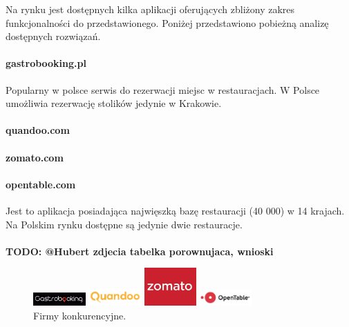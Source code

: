 \documentclass{article}
\begin{document}
Na rynku jest dostępnych kilka aplikacji oferujących zbliżony zakres funkcjonalności do przedstawionego. Poniżej przedstawiono pobieżną analizę dostępnych rozwiązań.

\paragraph{gastrobooking.pl}
Popularny w polsce serwis do rezerwacji miejsc w restauracjach. W Polsce umożliwia rezerwację stolików jedynie w Krakowie. 

\paragraph{quandoo.com}


\paragraph{zomato.com}

\paragraph{opentable.com}
Jest to aplikacja posiadająca najwięszką bazę restauracji (40 000) w 14 krajach. Na Polskim rynku dostępne są jedynie dwie restauracje. \\\\
{\color{red}\textbf{TODO: @Hubert zdjecia tabelka porownujaca, wnioski}}


\begin{figure}[h]
\centering
		\begin{minipage}{2cm}
			\includegraphics[width=2cm]{firma1}
		\end{minipage}
		\begin{minipage}{2cm}
			\includegraphics[width=2cm]{firma2}
		\end{minipage}
		\begin{minipage}{2cm}
			\includegraphics[width=2cm]{firma3}
		\end{minipage}
		\begin{minipage}{2cm}
			\includegraphics[width=2cm]{firma4}
		\end{minipage}
	\caption{Firmy konkurencyjne.}
	\label{fig:firmy}
\end{figure}
\end{document}
